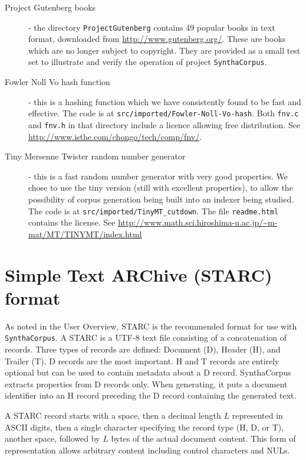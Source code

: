 \documentclass{article}
\newcommand{\projectName}{\texttt{SynthaCorpus}}
\begin{document}
\begin{description}
  \item [Project Gutenberg books] - the directory
    \texttt{ProjectGutenberg} contains 49 popular books in text
    format, downloaded from \url{http://www.gutenberg.org/}.  These
    are books which are no longer subject to copyright.  They
    are provided as a small test set to illustrate and verify the
    operation of project \projectName.
    \item [Fowler Noll Vo hash function] - this is a hashing function
      which we have consistently found to be fast and effective.  The code
      is at \texttt{src/imported/Fowler-Noll-Vo-hash}.  Both
      \texttt{fnv.c} and \texttt{fnv.h} in that directory include a
      licence allowing free distribution.  See \url{http://www.isthe.com/chongo/tech/comp/fnv/}.
      \item [Tiny Mersenne Twister random number generator] - this is
        a fast random number generator with very good properties.  We
        chose to use the tiny version (still with excellent
        properties), to allow the possibility of corpus generation
          being built into an indexer being studied.  The code is at
          \texttt{src/imported/TinyMT\_cutdown}.  The file
          \texttt{readme.html} contains the license.
          See \url{http://www.math.sci.hiroshima-u.ac.jp/~m-mat/MT/TINYMT/index.html}
      \end{description}
    
\section{Simple Text ARChive (STARC) format}
As noted in the User Overview, STARC is the recommended format for use
with \projectName.  A STARC is a UTF-8 text file consisting of a
concatenation of records.   Three types of records are defined: Document
(D), Header (H), and Trailer (T). D records are the most important.  H
and T records are entirely optional but can be used to contain
metadata about a D record.  SynthaCorpus extracts properties
from D records only.  When generating, it puts a document
identifier into an H record preceding the D record containing the
generated text.

A STARC record starts with a space, then a decimal length $L$
represented in ASCII digits, then a single character specifying the record
type (H, D, or T), another space, followed by $L$ bytes of the actual
document content.  This form of representation allows arbitrary
content including control characters and NULs.
\end{document}
